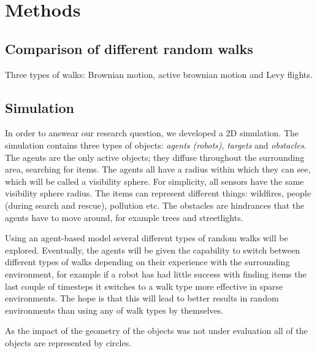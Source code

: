 \section{Methods}

\subsection{Comparison of different random walks}
Three types of walks: Brownian motion, active brownian motion and Levy flights. 

\subsection{Simulation}
In order to answear our research question, we developed a 2D simulation.
The simulation contains three types of objects: {\em agents (robots)}, {\em targets} and {\em obstacles}. 
The agents are the only active objects; they diffuse throughout the surrounding area, searching for items. 
The agents all have a radius within which they can see, which will be called a visibility sphere. 
For simplicity, all sensors have the same visibility sphere radius.
The items can represent different things: wildfires, people (during search and rescue), pollution etc. 
The obstacles are hindrances that the agents have to move around, for example trees and streetlights. 

Using an agent-based model several different types of random walks will be explored. Eventually, the agents will be given the capability to switch between different types of walks depending on their experience with the surrounding environment, for example if a robot has had little success with finding items the last couple of timesteps it switches to a walk type more effective in sparse environments.  
The hope is that this will lead to better results in random environments than using any of walk types by themselves.


As the impact of the geometry of the objects was not under evaluation all of the objects are represented by circles.  


